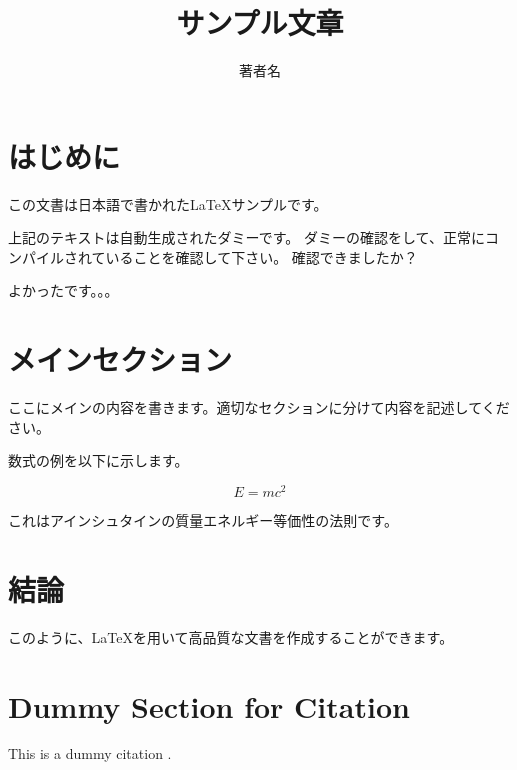 \documentclass[uplatex,11pt]{jsarticle}
\title{サンプル文章}
\author{著者名}
\begin{document}
\maketitle

\section{はじめに}
この文書は日本語で書かれたLaTeXサンプルです。

\lipsum[1] %

上記のテキストは自動生成されたダミーです。
ダミーの確認をして、正常にコンパイルされていることを確認して下さい。
確認できましたか？

よかったです。。。

\section{メインセクション}
ここにメインの内容を書きます。適切なセクションに分けて内容を記述してください。


数式の例を以下に示します。

\begin{equation}
E = mc^2
\end{equation}

これはアインシュタインの質量エネルギー等価性の法則です。

\section{結論}
このように、LaTeXを用いて高品質な文書を作成することができます。
\section*{Dummy Section for Citation}
This is a dummy citation \cite{dummy2023}.



\end{document}
